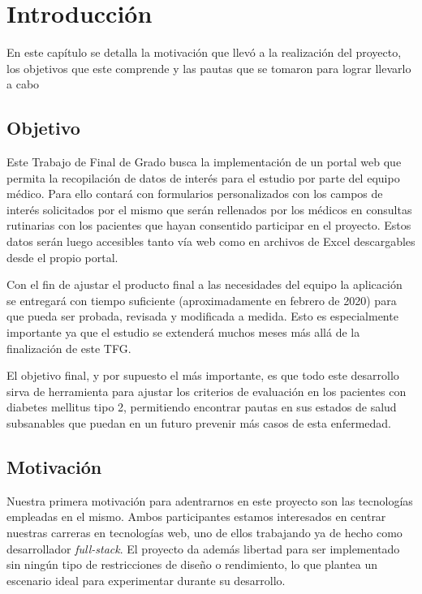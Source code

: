 \chapter{Introducción}
 En este capítulo se detalla la motivación que llevó a la realización del proyecto, los objetivos que este comprende y las pautas que se tomaron para lograr llevarlo a cabo
    
    \section{Objetivo}
    
    Este Trabajo de Final de Grado busca la implementación de un portal web que permita la recopilación de datos de interés para el estudio por parte del equipo médico. Para ello contará con formularios personalizados con los campos de interés  solicitados por el mismo que serán rellenados por los médicos en consultas rutinarias con los pacientes que hayan consentido participar en el proyecto. Estos datos serán luego accesibles tanto vía web como en archivos de Excel descargables desde el propio portal.\newline

	Con el fin de ajustar el producto final a las necesidades del equipo la aplicación se entregará con tiempo suficiente (aproximadamente en febrero de 2020) para que pueda ser probada, revisada y modificada a medida. Esto es especialmente importante ya que el estudio se extenderá muchos meses más allá de la finalización de este TFG.\newline

	El objetivo final, y por supuesto el más importante, es que todo este desarrollo sirva de herramienta para ajustar los criterios de evaluación en los pacientes con diabetes mellitus tipo 2, permitiendo encontrar pautas en sus estados de salud subsanables que puedan en un futuro prevenir más casos de esta enfermedad.\newpage
	
	\section{Motivación}
    
    Nuestra primera motivación para adentrarnos en este proyecto son las tecnologías empleadas en el mismo. Ambos participantes estamos interesados en centrar nuestras carreras en tecnologías web, uno de ellos trabajando ya de hecho como desarrollador \textit{full-stack}. El proyecto da además libertad para ser implementado sin ningún tipo de restricciones de diseño o rendimiento, lo que plantea un escenario ideal para experimentar durante su desarrollo.\newline

